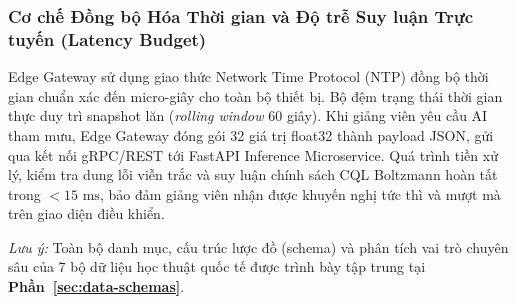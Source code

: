 \subsubsection{Cơ chế Đồng bộ Hóa Thời gian và Độ trễ Suy luận Trực tuyến (Latency Budget)}
Edge Gateway sử dụng giao thức Network Time Protocol (NTP) đồng bộ thời gian chuẩn xác đến micro-giây cho toàn bộ thiết bị. Bộ đệm trạng thái thời gian thực duy trì snapshot lăn (\textit{rolling window} 60 giây). Khi giảng viên yêu cầu AI tham mưu, Edge Gateway đóng gói 32 giá trị float32 thành payload JSON, gửi qua kết nối gRPC/REST tới FastAPI Inference Microservice. Quá trình tiền xử lý, kiểm tra dung lỗi viễn trắc và suy luận chính sách CQL Boltzmann hoàn tất trong \textbf{$< 15\text{ ms}$}, bảo đảm giảng viên nhận được khuyến nghị tức thì và mượt mà trên giao diện điều khiển.

\noindent\textit{Lưu ý:} Toàn bộ danh mục, cấu trúc lược đồ (schema) và phân tích vai trò chuyên sâu của 7 bộ dữ liệu học thuật quốc tế được trình bày tập trung tại \textbf{Phần~\ref{sec:data-schemas}}.

\newpage

